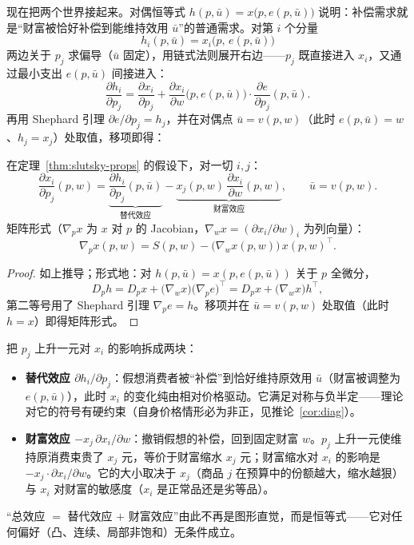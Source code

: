现在把两个世界接起来。对偶恒等式 $h(p,\bar u)=x\bigl(p,e(p,\bar u)\bigr)$ 说明：补偿需求就是“财富被恰好补偿到能维持效用 $\bar u$”的普通需求。对第 $i$ 个分量
\[
 h_i(p,\bar u)=x_i\bigl(p,\,e(p,\bar u)\bigr)
\]
两边关于 $p_j$ 求偏导（$\bar u$ 固定），用链式法则展开右边——$p_j$ 既直接进入 $x_i$，又通过最小支出 $e(p,\bar u)$ 间接进入：
\[
 \frac{\partial h_i}{\partial p_j}
 =\frac{\partial x_i}{\partial p_j}
 +\frac{\partial x_i}{\partial w}\bigl(p,e(p,\bar u)\bigr)\cdot\frac{\partial e}{\partial p_j}(p,\bar u).
\]
再用 Shephard 引理 $\partial e/\partial p_j=h_j$，并在对偶点 $\bar u=v(p,w)$（此时 $e(p,\bar u)=w$、$h_j=x_j$）处取值，移项即得：

\begin{theorem}[Slutsky 方程]\label{thm:slutsky-eq}
在定理~\ref{thm:slutsky-props} 的假设下，对一切 $i,j$：
\begin{equation}
 \boxed{\;
 \frac{\partial x_i}{\partial p_j}(p,w)
 =\underbrace{\frac{\partial h_i}{\partial p_j}(p,\bar u)}_{\text{替代效应}}
 -\underbrace{x_j(p,w)\,\frac{\partial x_i}{\partial w}(p,w)}_{\text{财富效应}},\qquad \bar u=v(p,w).\;}
 \label{eq:slutsky}
\end{equation}
矩阵形式（$\nabla_p x$ 为 $x$ 对 $p$ 的 Jacobian，$\nabla_w x=(\partial x_i/\partial w)_i$ 为列向量）：
\[
 \nabla_p x(p,w)=S(p,w)-\bigl(\nabla_w x(p,w)\bigr)\,x(p,w)^{\top}.
\]
\end{theorem}

\begin{proof}
如上推导；形式地：对 $h(p,\bar u)=x(p,e(p,\bar u))$ 关于 $p$ 全微分，
\[
 D_p h=D_p x+\bigl(\nabla_w x\bigr)\bigl(\nabla_p e\bigr)^{\top}
 =D_p x+\bigl(\nabla_w x\bigr)h^{\top},
\]
第二等号用了 Shephard 引理 $\nabla_p e=h$。移项并在 $\bar u=v(p,w)$ 处取值（此时 $h=x$）即得矩阵形式。
\end{proof}

\begin{remark}[逐项经济解释]
把 $p_j$ 上升一元对 $x_i$ 的影响拆成两块：
\begin{itemize}
\item \textbf{替代效应 $\partial h_i/\partial p_j$}：假想消费者被“补偿”到恰好维持原效用 $\bar u$（财富被调整为 $e(p,\bar u)$），此时 $x_i$ 的变化纯由相对价格驱动。它满足对称与负半定——理论对它的符号有硬约束（自身价格情形必为非正，见推论~\ref{cor:diag}）。
\item \textbf{财富效应 $-x_j\,\partial x_i/\partial w$}：撤销假想的补偿，回到固定财富 $w$。$p_j$ 上升一元使维持原消费束贵了 $x_j$ 元，等价于财富缩水 $x_j$ 元；财富缩水对 $x_i$ 的影响是 $-x_j\cdot\partial x_i/\partial w$。它的大小取决于 $x_j$（商品 $j$ 在预算中的份额越大，缩水越狠）与 $x_i$ 对财富的敏感度（$x_i$ 是正常品还是劣等品）。
\end{itemize}
“总效应 $=$ 替代效应 $+$ 财富效应”由此不再是图形直觉，而是恒等式——它对任何偏好（凸、连续、局部非饱和）无条件成立。
\end{remark}

